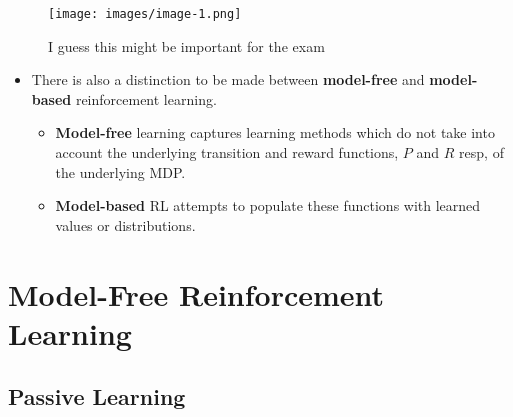 \documentclass[
]{book}
\providecommand{\tightlist}{%
  \setlength{\itemsep}{0pt}\setlength{\parskip}{0pt}}
\begin{document}
\begin{figure}
\hypertarget{fig:very_import}{%
\centering
\texttt{[image: images/image-1.png]}
\caption{I guess this might be important for the
exam}\label{fig:very_import}
}
\end{figure}

\begin{itemize}
\tightlist
\item
  There is also a distinction to be made between \textbf{model-free} and
  \textbf{model-based} reinforcement learning.

  \begin{itemize}
  \tightlist
  \item
    \textbf{Model-free} learning captures learning methods which do not
    take into account the underlying transition and reward functions,
    \(P\) and \(R\) resp, of the underlying MDP.
  \item
    \textbf{Model-based} RL attempts to populate these functions with
    learned values or distributions.
  \end{itemize}
\end{itemize}

\hypertarget{model-free-reinforcement-learning}{%
\section{Model-Free Reinforcement
Learning}\label{model-free-reinforcement-learning}}

\hypertarget{passive-learning}{%
\subsection{Passive Learning}\label{passive-learning}}
\end{document}
